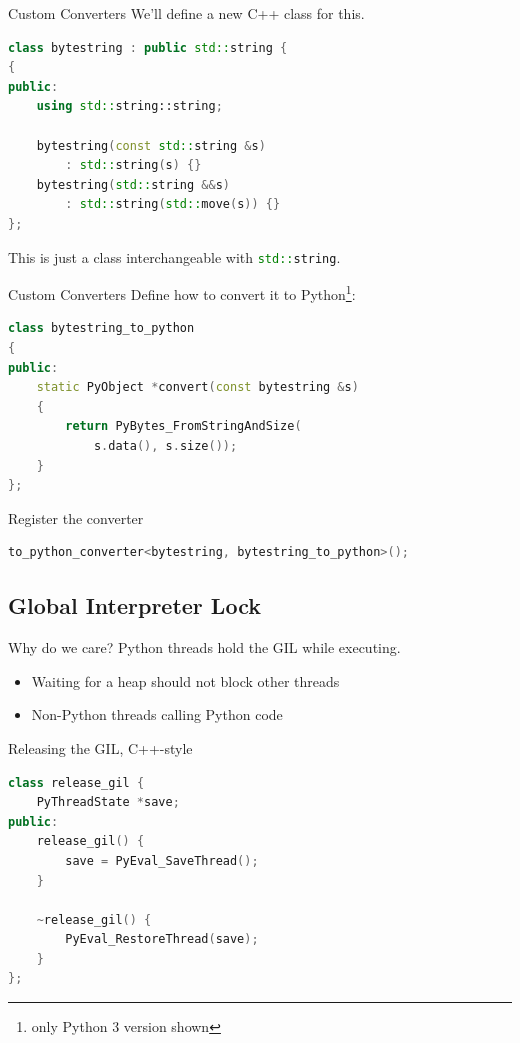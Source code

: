 \documentclass{beamer}
\def\linlinec{\lstinline[basicstyle=\ttfamily,language=c++]}
\begin{document}
\begin{frame}[fragile=singleslide]{Custom Converters}
We'll define a new C++ class for this.
  \begin{lstlisting}[language=c++]
class bytestring : public std::string {
{
public:
    using std::string::string;

    bytestring(const std::string &s)
        : std::string(s) {}
    bytestring(std::string &&s)
        : std::string(std::move(s)) {}
};
  \end{lstlisting}

This is just a class interchangeable with \linlinec"std::string".
\end{frame}

\begin{frame}[fragile=singleslide]{Custom Converters}
  Define how to convert it to Python\footnote{only Python 3 version shown}:
  \begin{lstlisting}[language=c++]
class bytestring_to_python
{
public:
    static PyObject *convert(const bytestring &s)
    {
        return PyBytes_FromStringAndSize(
            s.data(), s.size());
    }
};
  \end{lstlisting}

  Register the converter
  \begin{lstlisting}[language=c++]
to_python_converter<bytestring, bytestring_to_python>();
  \end{lstlisting}
\end{frame}

\subsection[GIL]{Global Interpreter Lock}
\begin{frame}{Why do we care?}
  Python threads hold the GIL while executing.
  \begin{itemize}[<+->]
    \item Waiting for a heap should not block other threads
    \item Non-Python threads calling Python code
  \end{itemize}
\end{frame}

\begin{frame}[fragile=singleslide]{Releasing the GIL, C++-style}
  \begin{lstlisting}[language=c++]
class release_gil {
    PyThreadState *save;
public:
    release_gil() {
        save = PyEval_SaveThread();
    }

    ~release_gil() {
        PyEval_RestoreThread(save);
    }
};
  \end{lstlisting}
\end{frame}
\end{document}
